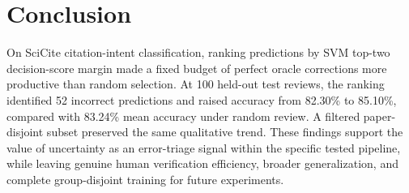 \documentclass[11pt]{article}
\begin{document}
\section{Conclusion}
On SciCite citation-intent classification, ranking predictions by SVM top-two decision-score margin made a fixed budget of perfect oracle corrections more productive than random selection. At 100 held-out test reviews, the ranking identified 52 incorrect predictions and raised accuracy from 82.30\% to 85.10\%, compared with 83.24\% mean accuracy under random review. A filtered paper-disjoint subset preserved the same qualitative trend. These findings support the value of uncertainty as an error-triage signal within the specific tested pipeline, while leaving genuine human verification efficiency, broader generalization, and complete group-disjoint training for future experiments.



\end{document}
